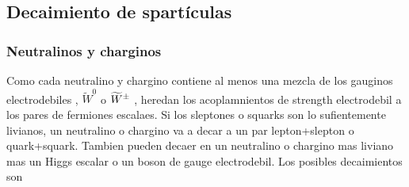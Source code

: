 









\subsection{Decaimiento de spartículas}


\subsubsection{Neutralinos y charginos}

Como cada neutralino y chargino contiene al menos una mezcla
de los gauginos electrodebiles {\bino}, $\tilde W^0$ o $\widetilde{W}^{\pm}$
, heredan los acoplamnientos de strength electrodebil a los pares
de fermiones escalaes. Si los sleptones o squarks son lo sufientemente
livianos, un neutralino o chargino va a decar a un par lepton+slepton
o quark+squark. Tambien pueden decaer en un neutralino o chargino
mas liviano mas un Higgs escalar o un boson de gauge electrodebil.
Los posibles decaimientos son


